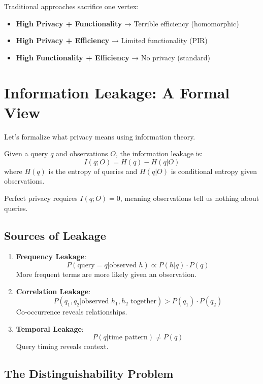 Traditional approaches sacrifice one vertex:
\begin{itemize}
\item \textbf{High Privacy + Functionality} → Terrible efficiency (homomorphic)
\item \textbf{High Privacy + Efficiency} → Limited functionality (PIR)  
\item \textbf{High Functionality + Efficiency} → No privacy (standard)
\end{itemize}

\section{Information Leakage: A Formal View}

Let's formalize what privacy means using information theory.

\begin{definition}
Given a query $q$ and observations $O$, the information leakage is:
$$I(q; O) = H(q) - H(q|O)$$
where $H(q)$ is the entropy of queries and $H(q|O)$ is conditional entropy given observations.
\end{definition}

Perfect privacy requires $I(q; O) = 0$, meaning observations tell us nothing about queries.

\subsection{Sources of Leakage}

\begin{enumerate}
\item \textbf{Frequency Leakage}: 
   $$P(\text{query} = q | \text{observed } h) \propto P(h|q) \cdot P(q)$$
   More frequent terms are more likely given an observation.

\item \textbf{Correlation Leakage}:
   $$P(q_1, q_2 | \text{observed } h_1, h_2 \text{ together}) > P(q_1) \cdot P(q_2)$$
   Co-occurrence reveals relationships.

\item \textbf{Temporal Leakage}:
   $$P(q | \text{time pattern}) \neq P(q)$$
   Query timing reveals context.
\end{enumerate}

\subsection{The Distinguishability Problem}

